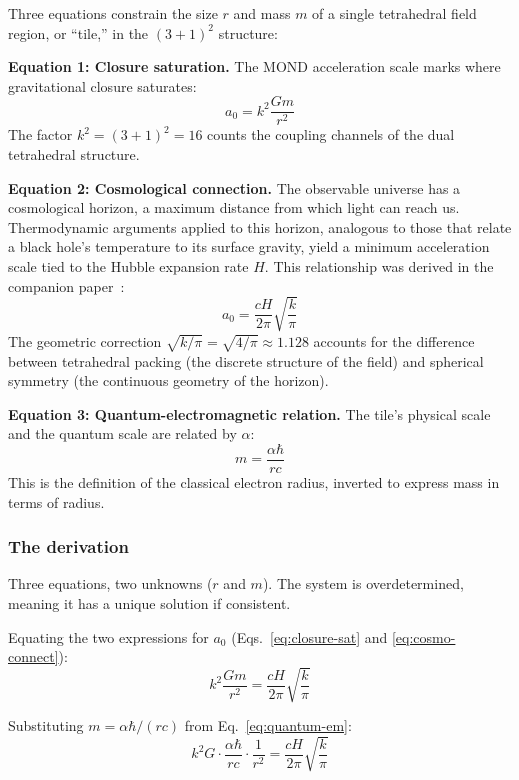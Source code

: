 \documentclass[aps,prd,preprint,superscriptaddress,showpacs,preprintnumbers,amsmath,amssymb,nofootinbib]{revtex4-2}
\begin{document}
Three equations constrain the size $r$ and mass $m$ of a single tetrahedral field region, or ``tile,'' in the $(3+1)^2$ structure:

\textbf{Equation 1: Closure saturation.} The MOND acceleration scale marks where gravitational closure saturates:
\begin{equation}
a_0 = k^2 \frac{Gm}{r^2}
\label{eq:closure-sat}
\end{equation}
The factor $k^2 = (3+1)^2 = 16$ counts the coupling channels of the dual tetrahedral structure.

\textbf{Equation 2: Cosmological connection.} The observable universe has a cosmological horizon, a maximum distance from which light can reach us. Thermodynamic arguments applied to this horizon, analogous to those that relate a black hole's temperature to its surface gravity, yield a minimum acceleration scale tied to the Hubble expansion rate $H$. This relationship was derived in the companion paper~\cite{paper5}:
\begin{equation}
a_0 = \frac{cH}{2\pi} \sqrt{\frac{k}{\pi}}
\label{eq:cosmo-connect}
\end{equation}
The geometric correction $\sqrt{k/\pi} = \sqrt{4/\pi} \approx 1.128$ accounts for the difference between tetrahedral packing (the discrete structure of the field) and spherical symmetry (the continuous geometry of the horizon).

\textbf{Equation 3: Quantum-electromagnetic relation.} The tile's physical scale and the quantum scale are related by $\alpha$:
\begin{equation}
m = \frac{\alpha \hbar}{rc}
\label{eq:quantum-em}
\end{equation}
This is the definition of the classical electron radius, inverted to express mass in terms of radius.

\subsubsection*{The derivation}

Three equations, two unknowns ($r$ and $m$). The system is overdetermined, meaning it has a unique solution if consistent.

Equating the two expressions for $a_0$ (Eqs.~\ref{eq:closure-sat} and \ref{eq:cosmo-connect}):
\begin{equation}
k^2 \frac{Gm}{r^2} = \frac{cH}{2\pi} \sqrt{\frac{k}{\pi}}
\end{equation}

Substituting $m = \alpha\hbar/(rc)$ from Eq.~\ref{eq:quantum-em}:
\begin{equation}
k^2 G \cdot \frac{\alpha\hbar}{rc} \cdot \frac{1}{r^2} = \frac{cH}{2\pi} \sqrt{\frac{k}{\pi}}
\end{equation}
\end{document}
